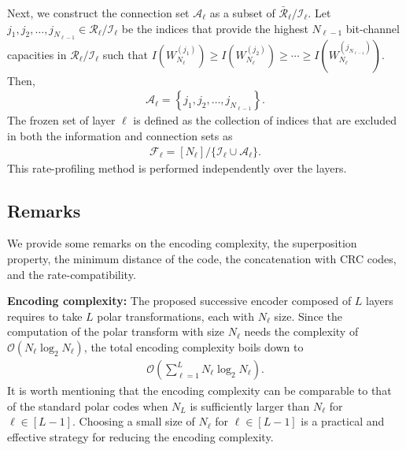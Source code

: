 \documentclass[conference]{IEEEtran}
\begin{document}
 Next, we construct the connection set $\mathcal{A}_{\ell}$ as a subset of $\mathcal{\bar R}_{\ell}/\mathcal{I}_{\ell}$. Let $j_1,j_2,\ldots, j_{N_{\ell-1}} \in \mathcal{R}_{\ell}/\mathcal{I}_{\ell}$ be the indices that provide the highest $N_{\ell-1}$ bit-channel capacities in $\mathcal{R}_{\ell}/\mathcal{I}_{\ell}$ such that  $ I\left(W_{N_{\ell}}^{(j_1)}\right) \geq I\left(W_{N_{\ell}}^{(j_2)}\right)\geq \cdots \geq I\left(W_{N_{\ell}}^{(j_{N_{\ell-1}})}\right)$. Then,
\begin{align}
	\mathcal{ A}_{\ell}=\left\{j_1,j_2,\ldots, j_{N_{\ell-1}}\right\}.
\end{align}
 The frozen set of layer $\ell$ is defined as the collection of indices that are excluded in both the information and connection sets as
\begin{align}
	\mathcal{F}_{\ell}=[N_{\ell}]/\{\mathcal{I}_{\ell}\cup \mathcal{A}_{\ell}\}.
\end{align}
This rate-profiling method is performed independently over the layers. 



 \subsection{Remarks}
We provide some remarks on the encoding complexity, the superposition property, the minimum distance of the code, the concatenation with CRC codes, and the rate-compatibility.
  
 
 
 {\bf Encoding complexity:}  The proposed successive encoder composed of $L$ layers requires to take $L$ polar transformations, each with $N_{\ell}$ size. Since the computation of the polar transform with size $N_{\ell}$ needs the complexity of $\mathcal{O}(N_{\ell}\log_2 N_{\ell})$, the total encoding complexity boils down to
\begin{align}
	\mathcal{O}\left(\sum_{\ell=1}^LN_{\ell}\log_2 N_{\ell}\right).
\end{align}
It is worth mentioning that the encoding complexity can be comparable to that of the standard polar codes when $N_L$ is sufficiently larger than $N_{\ell}$ for $\ell\in [L-1]$. Choosing a small size of $N_{\ell}$ for $\ell\in [L-1]$ is a practical and effective strategy for reducing the encoding complexity.
\end{document}
